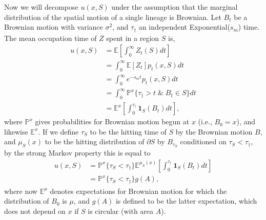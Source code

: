 \documentclass{article}
\renewcommand{\P}{\mathbb{P}}
\newcommand{\E}{\mathbb{E}}
\newcommand{\one}{\mathbf{1}}
\begin{document}
Now we will decompose $u(x,S)$ under the assumption that 
the marginal distribution of the spatial motion of a single lineage is Brownian.
Let $B_t$ be a Brownian motion with variance $\sigma^2$, 
and $\tau_\dagger$ an independent Exponential($s_m$) time.
The mean occupation time of $Z$ spent in a region $S$ is,
\begin{align}
    u(x,S) &= \E\left[\int_0^\infty Z_t(S) dt \right] \\
           &= \int_0^\infty \E[Z_t] p_t(x,S) dt \\
        &= \int_0^\infty e^{-s_m t} p_t(x,S) dt \\
        &= \int_0^\infty \P^x\{ \tau_\dagger > t \; \& \; B_t \in S \} dt \\
        &= \E^x\left[ \int_0^{\tau_\dagger} \one_S(B_t) dt \right]  ,
\end{align}
where $\P^x$ gives probabilities for Brownian motion begun at $x$ (i.e., $B_0=x$),
and likewise $\E^x$.
If we define
$\tau_S$ to be the hitting time of $S$ by the Brownian motion $B$,
and $\mu_S(x)$ to be the hitting distribution of $\partial S$ by $B_{\tau_S}$ conditioned on $\tau_S < \tau_\dagger$,
by the strong Markov property this is equal to
\begin{align}
    u(x,S) %
           &= \P^x\{ \tau_S < \tau_\dagger \}  \E^{\mu_S(x)}\left[ \int_0^{\tau_\dagger} \one_S(B_t) dt \right] \\
           &= \P^x\{ \tau_S < \tau_\dagger \}  g(A)  ,
\end{align}
where now $\E^\mu$ denotes expectations for Brownian motion for which the distribution of $B_0$ is $\mu$, 
and $g(A)$ is defined to be the latter expectation,
which does not depend on $x$ if $S$ is circular (with area $A$).
\end{document}
